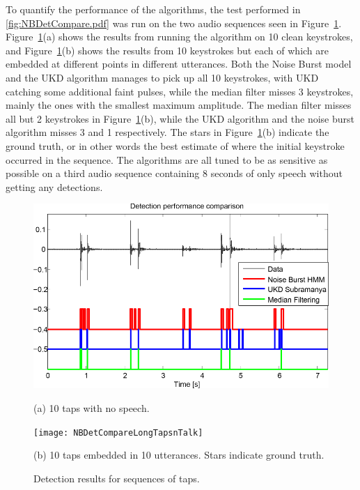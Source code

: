 To quantify the performance of the algorithms, the test performed in \ref{fig:NBDetCompare.pdf} was run on the two audio sequences seen in Figure~\ref{fig:NBDetectionResults}. Figure~\ref{fig:NBDetectionResults}(a) shows the results from running the algorithm on 10 clean keystrokes, and Figure~\ref{fig:NBDetectionResults}(b) shows the results from 10 keystrokes but each of which are embedded at different points in different utterances. Both the Noise Burst model and the UKD algorithm manages to pick up all 10 keystrokes, with UKD catching some additional faint pulses, while the median filter misses 3 keystrokes, mainly the ones with the smallest maximum amplitude. The median filter misses all but 2 keystrokes in Figure~\ref{fig:NBDetectionResults}(b), while the UKD algorithm and the noise burst algorithm misses 3 and 1 respectively. The stars in Figure~\ref{fig:NBDetectionResults}(b) indicate the ground truth, or in other words the best estimate of where the initial keystroke occurred in the sequence. The algorithms are all tuned to be as sensitive as possible on a third audio sequence containing 8 seconds of only speech without getting any detections.

\begin{figure}
\begin{minipage}[b]{1.0\linewidth}
  \centering
  \centerline{\includegraphics[width=12.5cm]{NBDetCompareLongTaps}}
  \centerline{(a) 10 taps with no speech.}\medskip
\end{minipage}
%
\begin{minipage}[b]{1.0\linewidth}
  \centering
  \centerline{\texttt{[image: NBDetCompareLongTapsnTalk]}}
  \centerline{(b) 10 taps embedded in 10 utterances. Stars indicate ground truth.}\medskip
\end{minipage}
\hfill
%
\caption{Detection results for sequences of taps.}
\label{fig:NBDetectionResults}
\end{figure}

